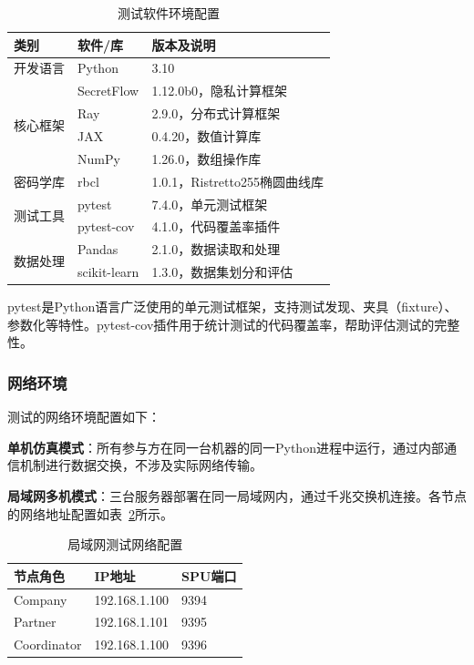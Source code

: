 \begin{table}[htbp]
    \centering
    \caption{测试软件环境配置}
    \label{tab:test-software}
    \begin{tabular}{llp{5cm}}
        \toprule
        \textbf{类别} & \textbf{软件/库} & \textbf{版本及说明} \\
        \midrule
        开发语言 & Python & 3.10 \\
        \midrule
        \multirow{4}{*}{核心框架} & SecretFlow & 1.12.0b0，隐私计算框架 \\
        & Ray & 2.9.0，分布式计算框架 \\
        & JAX & 0.4.20，数值计算库 \\
        & NumPy & 1.26.0，数组操作库 \\
        \midrule
        密码学库 & rbcl & 1.0.1，Ristretto255椭圆曲线库 \\
        \midrule
        \multirow{2}{*}{测试工具} & pytest & 7.4.0，单元测试框架 \\
        & pytest-cov & 4.1.0，代码覆盖率插件 \\
        \midrule
        \multirow{2}{*}{数据处理} & Pandas & 2.1.0，数据读取和处理 \\
        & scikit-learn & 1.3.0，数据集划分和评估 \\
        \bottomrule
    \end{tabular}
\end{table}

pytest是Python语言广泛使用的单元测试框架，支持测试发现、夹具（fixture）、参数化等特性。pytest-cov插件用于统计测试的代码覆盖率，帮助评估测试的完整性。

\subsubsection{网络环境}

测试的网络环境配置如下：

\textbf{单机仿真模式}：所有参与方在同一台机器的同一Python进程中运行，通过内部通信机制进行数据交换，不涉及实际网络传输。

\textbf{局域网多机模式}：三台服务器部署在同一局域网内，通过千兆交换机连接。各节点的网络地址配置如表~\ref{tab:test-network}所示。

\begin{table}[htbp]
    \centering
    \caption{局域网测试网络配置}
    \label{tab:test-network}
    \begin{tabular}{lll}
        \toprule
        \textbf{节点角色} & \textbf{IP地址} & \textbf{SPU端口} \\
        \midrule
        Company & 192.168.1.100 & 9394 \\
        Partner & 192.168.1.101 & 9395 \\
        Coordinator & 192.168.1.100 & 9396 \\
        \bottomrule
    \end{tabular}
\end{table}

